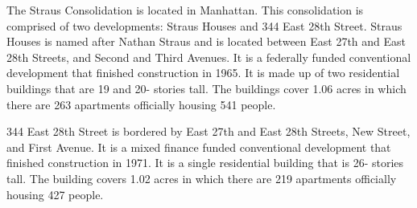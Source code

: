 The Straus Consolidation is located in Manhattan. This consolidation is comprised of two developments: Straus Houses and 344 East 28th Street. Straus Houses is named after Nathan Straus and is located between East 27th and East 28th Streets, and Second and Third Avenues. It is a federally funded conventional development that finished construction in 1965. It is made up of two residential buildings that are 19 and 20- stories tall. The buildings cover 1.06 acres in which there are 263 apartments officially housing 541 people.  \par \vspace{.7\baselineskip}344 East 28th Street is bordered by East 27th and East 28th Streets, New Street, and First Avenue. It is a mixed finance funded conventional development that finished construction in 1971. It is a single residential building that is 26- stories tall. The building covers 1.02 acres in which there are 219 apartments officially housing 427 people.